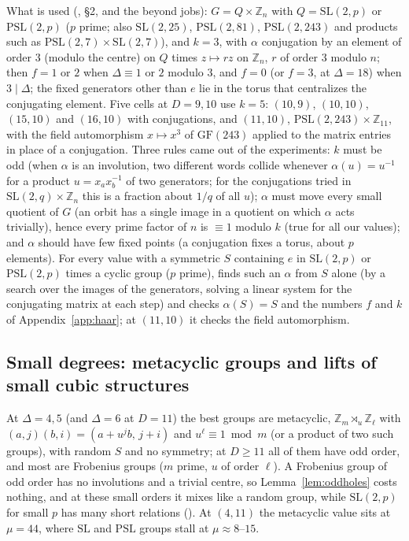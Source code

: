 \documentclass[11pt]{amsart}
\theoremstyle{definition}
\theoremstyle{remark}
\begin{document}
What is used (, \S2, and the beyond jobs): $G=Q\times\mathbb{Z}_n$ with $Q=\mathrm{SL}(2,p)$ or $\mathrm{PSL}(2,p)$ ($p$ prime; also $\mathrm{SL}(2,25)$, $\mathrm{PSL}(2,81)$, $\mathrm{PSL}(2,243)$ and products such as $\mathrm{PSL}(2,7)\times\mathrm{SL}(2,7)$), and $k=3$, with $\alpha$ conjugation by an element of order $3$ (modulo the centre) on $Q$ times $z\mapsto rz$ on $\mathbb{Z}_n$, $r$ of order $3$ modulo $n$; then $f=1$ or $2$ when $\Delta\equiv1$ or $2$ modulo $3$, and $f=0$ (or $f=3$, at $\Delta=18$) when $3\mid\Delta$; the fixed generators other than $e$ lie in the torus that centralizes the conjugating element. Five cells at $D=9,10$ use $k=5$: $(10,9)$, $(10,10)$, $(15,10)$ and $(16,10)$ with conjugations, and $(11,10)$, $\mathrm{PSL}(2,243)\times\mathbb{Z}_{11}$, with the field automorphism $x\mapsto x^3$ of $\mathrm{GF}(243)$ applied to the matrix entries in place of a conjugation. Three rules came out of the experiments: $k$ must be odd (when $\alpha$ is an involution, two different words collide whenever $\alpha(u)=u^{-1}$ for a product $u=x_ax_b^{-1}$ of two generators; for the conjugations tried in $\mathrm{SL}(2,q)\times\mathbb{Z}_n$ this is a fraction about $1/q$ of all $u$); $\alpha$ must move every small quotient of $G$ (an orbit has a single image in a quotient on which $\alpha$ acts trivially), hence every prime factor of $n$ is $\equiv1$ modulo $k$ (true for all our values); and $\alpha$ should have few fixed points (a conjugation fixes a torus, about $p$ elements). For every value with a symmetric $S$ containing $e$ in $\mathrm{SL}(2,p)$ or $\mathrm{PSL}(2,p)$ times a cyclic group ($p$ prime),  finds such an $\alpha$ from $S$ alone (by a search over the images of the generators, solving a linear system for the conjugating matrix at each step) and checks $\alpha(S)=S$ and the numbers $f$ and $k$ of Appendix~\ref{app:haar}; at $(11,10)$ it checks the field automorphism.

\subsection{Small degrees: metacyclic groups and lifts of small cubic structures}\label{ssec:smalldeg}

At $\Delta=4,5$ (and $\Delta=6$ at $D=11$) the best groups are metacyclic, $\mathbb{Z}_m\rtimes_u\mathbb{Z}_\ell$ with $(a,j)(b,i)=(a+u^jb,\,j+i)$ and $u^\ell\equiv1\bmod m$ (or a product of two such groups), with random $S$ and no symmetry; at $D\ge11$ all of them have odd order, and most are Frobenius groups ($m$ prime, $u$ of order $\ell$). A Frobenius group of odd order has no involutions and a trivial centre, so Lemma~\ref{lem:oddholes} costs nothing, and at these small orders it mixes like a random group, while $\mathrm{SL}(2,p)$ for small $p$ has many short relations (). At $(4,11)$ the metacyclic value sits at $\mu=44$, where $\mathrm{SL}$ and $\mathrm{PSL}$ groups stall at $\mu\approx8$--$15$.
\end{document}
